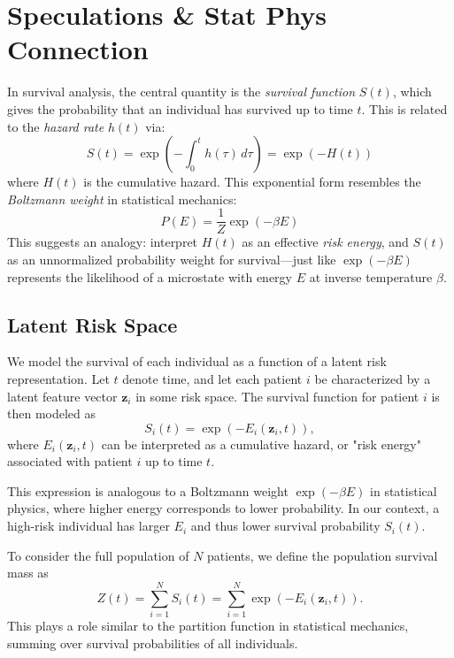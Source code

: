 \documentclass[12pt]{article}
\begin{document}
\section{Speculations \& Stat Phys Connection}

In survival analysis, the central quantity is the \textit{survival function} $ S(t) $, which gives the probability that an individual has survived up to time $ t $. This is related to the \textit{hazard rate} $ h(t) $ via:
\begin{equation}
S(t) = \exp\left(-\int_0^t h(\tau) \, d\tau \right) = \exp(-H(t))
\end{equation}
where $ H(t) $ is the cumulative hazard. This exponential form resembles the \textit{Boltzmann weight} in statistical mechanics:
\begin{equation}
P(E) = \frac{1}{Z} \exp(-\beta E)
\end{equation}
This suggests an analogy: interpret $ H(t) $ as an effective \textit{risk energy}, and $ S(t) $ as an unnormalized probability weight for survival—just like $ \exp(-\beta E) $ represents the likelihood of a microstate with energy $ E $ at inverse temperature $ \beta $.

\subsection{Latent Risk Space}

We model the survival of each individual as a function of a latent risk representation. Let $t$ denote time, and let each patient $i$ be characterized by a latent feature vector $\mathbf{z}_i$ in some risk space. The survival function for patient $i$ is then modeled as
$$
S_i(t) = \exp\left(-E_i(\mathbf{z}_i, t)\right),
$$
where $E_i(\mathbf{z}_i, t)$ can be interpreted as a cumulative hazard, or "risk energy" associated with patient $i$ up to time $t$.

This expression is analogous to a Boltzmann weight $\exp(-\beta E)$ in statistical physics, where higher energy corresponds to lower probability. In our context, a high-risk individual has larger $E_i$ and thus lower survival probability $S_i(t)$.

To consider the full population of $N$ patients, we define the population survival mass as
$$
Z(t) = \sum_{i=1}^{N} S_i(t) = \sum_{i=1}^{N} \exp\left(-E_i(\mathbf{z}_i, t)\right).
$$
This plays a role similar to the partition function in statistical mechanics, summing over survival probabilities of all individuals.
\end{document}

